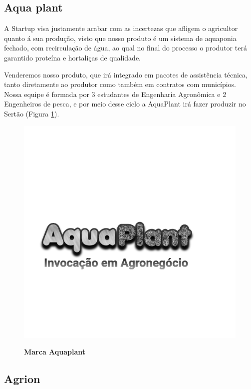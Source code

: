 \subsection{Aqua plant}



A Startup visa justamente acabar com as incertezas que  afligem o agricultor quanto á sua produção, visto que nosso produto é um sistema de aquaponia fechado, com recirculação de água, ao qual no final do processo o produtor terá garantido proteína e hortaliças de qualidade. 

Venderemos nosso produto, que irá integrado em pacotes de assistência técnica, tanto diretamente ao produtor como também em contratos com municípios. Nossa equipe é formada por 3 estudantes de Engenharia Agronômica e 2 Engenheiros de pesca, e por meio desse ciclo a AquaPlant irá fazer produzir no Sertão (Figura \ref{figura_13}).


\begin{figure}[H]
\centering
\caption{\textbf{Marca Aquaplant}}
\includegraphics[scale=0.4]{Imagens/aquaplant.png}
\label{figura_13}
\end{figure}


\subsection{Agrion}

